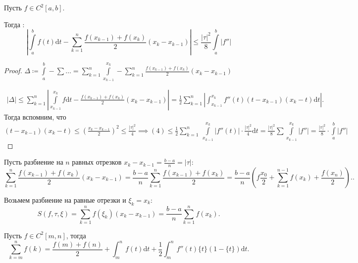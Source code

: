 \begin{theorem}
    Пусть $f \in C^2[a, b]$.

    Тогда : \[\left|\int\limits_a^b f(t) \mathrm{d}t - \sum_{k=1}^n \frac{f(x_{k-1}) + f(x_k)}{2}(x_k - x_{k-1})\right| \le \frac{|\tau|^2}{8} \int\limits_a^b |f''|\]
\end{theorem}
\begin{proof}
    $\Delta \coloneqq \int\limits_a^b - \sum \ldots = \sum\limits_{k=1}^n \int\limits_{x_{k-1}}^{x_k} - \sum\limits_{k=1}^n \frac{f(x_{k-1}) + f(x_k)}{2}(x_k - x_{k-1})$

    \begin{align}
        |\Delta| \le  \sum\limits_{k=1}^n |\int\limits_{x_{k-1}}^{x_k} f\mathrm{d}t - \frac{f(x_{k-1}) + f(x_k)}{2}(x_k - x_{k-1})| = \frac{1}{2} \sum\limits_{k=1}^n \left| \int_{x_{k-1}}^{x_k} f''(t)(t-x_{k-1})(x_k - t)\mathrm{d}t\right|
    .\end{align} Тогда вспомним, что $(t-x_{k-1})(x_k - t) \le \left( \frac{x_k - x_{k-1}}{2}\right)^2 \le \frac{|\tau|^2}{4} \implies (4) \le \frac{1}{2} \sum\limits_{k=1}^n\ \int\limits_{x_{k-1}}^{x_k}|f''(t)| \cdot \frac{|\tau|^2}{4} \mathrm{d}t = \frac{|\tau|^2}{8} \sum \int\limits_{x_{k-1}}^{x_k} |f''| = \frac{|\tau|^2}{8} \cdot \int\limits_a^b |f''|$
\end{proof}
\begin{remark}
    Пусть разбиение на $n$ равных отрезков  $x_k - x_{k-1} = \frac{b-a}{n} = |\tau|$:
    \[
        \sum_{k=1}^n \frac{f(x_{k-1}) + f(x_k)}{2}(x_k - x_{k-1}) = \frac{b-a}{n} \sum_{k=1}^n \frac{f(x_{k-1}) + f(x_k)}{2} = \frac{b-a}{n}(f\frac{x_0}{2} + \sum_{k=1}^{n-1}f(x_k) + \frac{f(x_n)}{2}).
    .\] 
\end{remark}
\begin{remark}
    Возьмем разбиение на равные отрезки и $\xi_k = x_k$:
     \[
         S(f, \tau, \xi) = \sum_{k=1}^n f(\xi_k)(x_k - x_{k-1}) = \frac{b-a}{n} \sum_{k=1}^n f(x_k)
    .\] 
\end{remark}
\begin{theorem}
    Пусть $f \in C^2[m, n]$, тогда
     \[
         \sum_{k=m}^n f(k) = \frac{f(m) + f(n)}{2} + \int_m^n f(t) \mathrm{d}t + \frac{1}{2} \int_m^n f''(t)\{t\}(1-\{t\})\mathrm{d}t
    .\]
\end{theorem}
